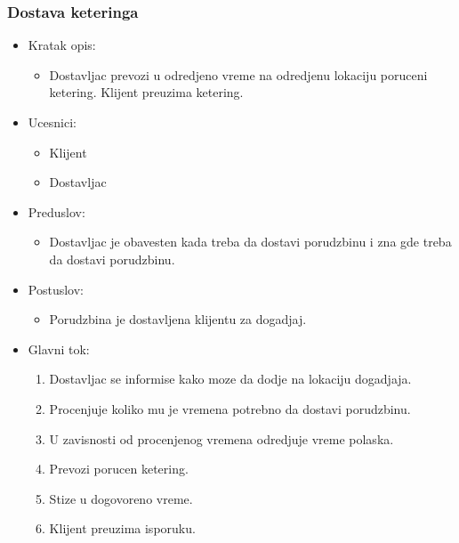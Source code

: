 \documentclass[a4paper]{article}
\begin{document}
\subsubsection{Dostava keteringa}
\begin{itemize}
    \item Kratak opis:
    \begin{itemize}
        \item Dostavljac prevozi u odredjeno vreme na odredjenu lokaciju poruceni ketering.
Klijent preuzima ketering.
    \end{itemize}
\end{itemize}
  \begin{itemize}
        \item Ucesnici:
          \begin{itemize}
        \item Klijent
    \end{itemize}
      \begin{itemize}
        \item Dostavljac
    \end{itemize}
    \end{itemize}
      \begin{itemize}
        \item Preduslov:
          \begin{itemize}
        \item Dostavljac je obavesten kada treba da dostavi porudzbinu i zna gde treba da dostavi porudzbinu.
   \end{itemize}
    
    \end{itemize}
      \begin{itemize}
        \item Postuslov:
          \begin{itemize}
        \item Porudzbina je dostavljena klijentu za dogadjaj.
    \end{itemize}
    \end{itemize}
      \begin{itemize}
        \item Glavni tok:
          \begin{enumerate}
              \item Dostavljac se informise kako moze da dodje na lokaciju dogadjaja.
        
              \item Procenjuje koliko mu je vremena potrebno da dostavi porudzbinu.
         
              \item U zavisnosti od procenjenog vremena odredjuje vreme polaska.
      
              \item Prevozi porucen ketering.
         
              \item Stize u dogovoreno vreme.
         
              \item Klijent preuzima isporuku.
          \end{enumerate}
    \end{itemize}
\end{document}
